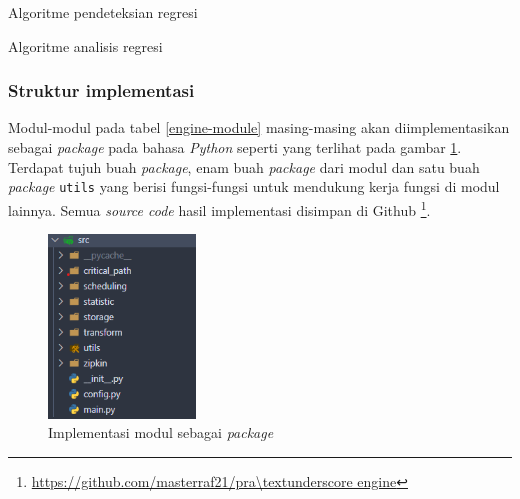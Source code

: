 \begin{algorithm}[hbt!]
	
	\BlankLine
	
	
	\caption{Algoritme pendeteksian regresi}\label{alg:regression-detection}
\end{algorithm}
\begin{algorithm}[hbt!]
	
	
	
	
	\caption{Algoritme analisis regresi}\label{alg:regression-analysis}
\end{algorithm}


\subsubsection{Struktur implementasi}
Modul-modul pada tabel \ref{engine-module} masing-masing akan diimplementasikan sebagai \textit{package} pada bahasa \textit{Python} seperti yang terlihat pada gambar \ref{package}. Terdapat tujuh buah \textit{package}, enam buah \textit{package} dari modul dan satu buah \textit{package} \texttt{utils} yang berisi fungsi-fungsi untuk mendukung kerja fungsi di modul lainnya. Semua \textit{source code} hasil implementasi disimpan di Github \footnote{\url{https://github.com/masterraf21/pra\textunderscore engine}}.
\begin{figure}[!htb]
	\centering
	\includegraphics[width=0.35\textwidth]{resources/ch4/packages.png}
	\caption{Implementasi modul sebagai \textit{package}}
	\label{package}
\end{figure} 

